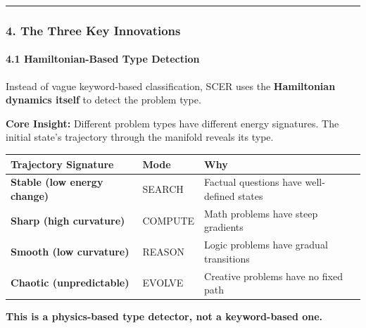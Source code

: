 \documentclass[
  11pt,
  a4paper,
]{article}
\begin{document}
\begin{center}\rule{0.5\linewidth}{0.5pt}\end{center}

\subsubsection{4. The Three Key
Innovations}\label{the-three-key-innovations}

\paragraph{4.1 Hamiltonian-Based Type
Detection}\label{hamiltonian-based-type-detection}

Instead of vague keyword-based classification, SCER uses the
\textbf{Hamiltonian dynamics itself} to detect the problem type.

\textbf{Core Insight:} Different problem types have different energy
signatures. The initial state's trajectory through the manifold reveals
its type.

\begin{longtable}[]{@{}
  >{\raggedright\arraybackslash}p{}
  >{\raggedright\arraybackslash}p{}
  >{\raggedright\arraybackslash}p{}@{}}
\toprule\noalign{}
\begin{minipage}[b]{\linewidth}\raggedright
Trajectory Signature
\end{minipage} & \begin{minipage}[b]{\linewidth}\raggedright
Mode
\end{minipage} & \begin{minipage}[b]{\linewidth}\raggedright
Why
\end{minipage} \\
\midrule\noalign{}
\endhead
\bottomrule\noalign{}
\endlastfoot
\textbf{Stable (low energy change)} & SEARCH & Factual questions have
well-defined states \\
\textbf{Sharp (high curvature)} & COMPUTE & Math problems have steep
gradients \\
\textbf{Smooth (low curvature)} & REASON & Logic problems have gradual
transitions \\
\textbf{Chaotic (unpredictable)} & EVOLVE & Creative problems have no
fixed path \\
\end{longtable}

\textbf{This is a physics-based type detector, not a keyword-based one.}
\end{document}
